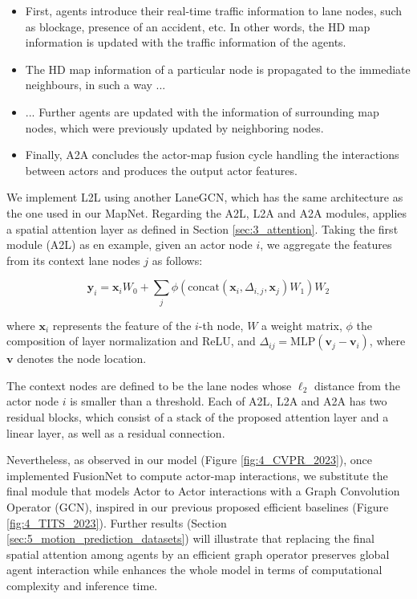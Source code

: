 \begin{itemize}
	\item First, agents introduce their real-time traffic information to lane nodes, such as blockage, presence of an accident, etc. In other words, the HD map information is updated with the traffic information of the agents.
	\item The HD map information of a particular node is propagated to the immediate neighbours, in such a way ...
	\item ... Further agents are updated with the information of surrounding map nodes, which were previously updated by neighboring nodes.
	\item Finally, A2A concludes the actor-map fusion cycle handling the interactions between actors and produces the output actor features.
	
\end{itemize}

We implement L2L using another LaneGCN, which has the same architecture as the one used in our MapNet. Regarding the A2L, L2A and A2A modules, \cite{liang2020learning} applies a spatial attention layer as defined in Section \ref{sec:3_attention}. Taking the first module (A2L) as en example, given an actor node $i$, we aggregate the features from its context lane nodes $j$ as follows:

\begin{equation}
	\mathbf{y}_i = \mathbf{x}_i W_0 + \sum_j \phi ( \text{concat} (\mathbf{x}_i, \Delta_{i,j}, \mathbf{x}_j) W_1) W_2
	\label{equ:attention}
\end{equation}

where $\mathbf{x}_i$ represents the feature of the $i$-th node, $W$ a weight matrix, $\phi$ the composition of layer normalization and ReLU, and $\Delta_{ij} = \text{MLP}(\mathbf{v}_j - \mathbf{v}_i)$, where $\mathbf{v}$ denotes the node location.

The context nodes are defined to be the lane nodes whose $\ell_2$ distance from the actor node $i$ is smaller than a threshold. Each of A2L, L2A and A2A has two residual blocks, which consist of a stack of the proposed attention layer and a linear layer, as well as a residual connection. 

Nevertheless, as observed in our model (Figure \ref{fig:4_CVPR_2023}), once implemented FusionNet to compute actor-map interactions, we substitute the final module that models Actor to Actor interactions with a Graph Convolution Operator (GCN), inspired in our previous proposed efficient baselines (Figure \ref{fig:4_TITS_2023}). Further results (Section \ref{sec:5_motion_prediction_datasets}) will illustrate that replacing the final spatial attention among agents by an efficient graph operator preserves global agent interaction while enhances the whole model in terms of computational complexity and inference time.

